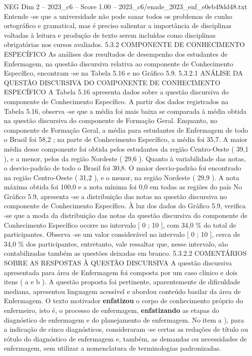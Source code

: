 \begin{textsample}{NEG Dim 2 – 2023\_c6 – Score 1.00 – 2023\_c6/enade\_2023\_enf\_e0eb49dd48.txt}
Entende -se que a universidade não pode sanar todos os problemas de cunho ortográfico e gramatical, mas é preciso salientar a importância de disciplinas voltadas à leitura e produção de texto serem incluídas como disciplinas obrigatórias nos cursos avaliados. 5.3.2 COMPONENTE DE CONHECIMENTO ESPECÍFICO As análises dos resultados de desempenho dos estudantes de Enfermagem, na questão discursiva relativa ao componente de Conhecimento Específico, encontram -se na Tabela 5.16 e no Gráfico 5.9. 5.3.2.1 ANÁLISE DA QUESTÃO DISCURSIVA DO COMPONENTE DE CONHECIMENTO ESPECÍFICO A Tabela 5.16 apresenta dados sobre a questão discursiva do componente de Conhecimento Específico.
A partir dos dados registrados na Tabela 5.16, observa -se que a média foi mais baixa se comparada à média obtida na questão discursiva do componente de Formação Geral.
Enquanto, no componente de Formação Geral, a média para estudantes de Enfermagem de todo o Brasil foi 58,2 ; na parte de Conhecimento Específico, a média foi 35,7.
A maior média desse componente foi obtida pelos estudantes da região Centro-Oeste ( 39,1 ), e a menor, pelos da região Nordeste ( 29,6 ).
Quanto à variabilidade das notas, o desvio-padrão de todo o Brasil foi 30,8.
O maior desvio-padrão foi encontrado na região Centro-Oeste ( 31,2 ), e o menor, na região Nordeste ( 29,9 ).
A nota máxima obtida foi 100,0 e a nota mínima foi 0,0 em todas as regiões do país No Gráfico 5.9, apresenta -se a distribuição das notas na questão discursiva no componente de Conhecimento Específico.
À luz dos dados do Gráfico 5.9, verifica -se que a moda da distribuição das notas da questão discursiva do componente de Conhecimento Específico ocorre no intervalo [ 0 ; 10 ], com 34,0 \% do total de participantes.
Observa -se um valor considerável no intervalo [ 0 ; 10 ], cerca de 34,0 \% dos participantes, entretanto, vale ressaltar que, nesse intervalo, são contabilizadas também as questões deixadas em branco. 5.3.2.2 COMENTÁRIOS SOBRE AS RESPOSTAS À QUESTÃO DISCURSIVA A questão discursiva apresentada para área de Enfermagem foi composta por um caso clínico e dois itens ( a e b ).
A questão proposta foi pertinente, aparentemente de dificuldade mediana, apresentou linguagem acessível e abordou conteúdo basilar da área de Enfermagem.
O texto motivador \textbf{enfatizou} o corpo de conhecimento próprio do enfermeiro, isto é, o processo de enfermagem, \textbf{enfatizando} as etapas do diagnóstico de enfermagem e do planejamento de enfermagem.
No item a ), para a indicação de cinco diagnósticos, consideraram -se certas as redações de título ou rótulo do diagnóstico de enfermagem e, também, as demandas ou necessidades de enfermagem, sem utilizar a nomenclatura de terminologias padronizadas.

\end{textsample}
